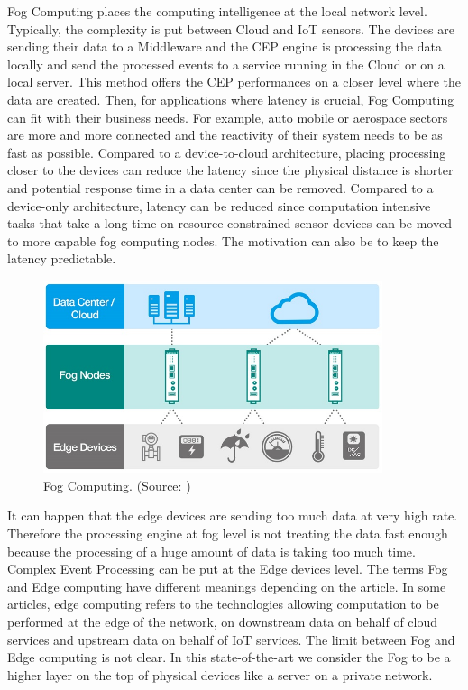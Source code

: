 \documentclass[11pt]{article}
\begin{document}
Fog Computing places the computing intelligence at the local network level. Typically, the complexity is put between Cloud and IoT sensors. The devices are sending their data to a Middleware and the CEP engine is processing the data locally and send the processed events to a service running in the Cloud or on a local server. This method offers the CEP performances on a closer level where the data are created. Then, for applications where latency is crucial, Fog Computing can fit with their business needs. For example, auto mobile or aerospace sectors are more and more connected and the reactivity of their system needs to be as fast as possible. Compared to a device-to-cloud architecture, placing processing closer to the devices can reduce the latency since the physical distance is shorter and potential response time in a data center can be removed. Compared to a device-only architecture, latency can be reduced since computation intensive tasks that take a long time on resource-constrained sensor devices can be moved to more capable fog computing nodes. The motivation can also be to keep the latency predictable.\cite{Towards-power-consumption-delay}

\begin{figure}[H]
	\includegraphics[width=\textwidth,height=160pt]{assets/Fog_Computing.jpg}
	\caption[Fog Computing]{
		Fog Computing. (Source: \cite{fog-computing})
	}
	\label{fig:Fog-Computing}
\end{figure}

It can happen that the edge devices are sending too much data at very high rate. Therefore the processing engine at fog level is not treating the data fast enough because the processing of a huge amount of data is taking too much time. Complex Event Processing can be put at the Edge devices level. The terms Fog and Edge computing have different meanings depending on the article. In some articles, edge computing refers to the technologies allowing computation to be performed at the edge of the network, on downstream data on behalf of cloud services and upstream data on behalf of IoT services.\cite{Edge-Computing-Vision-and-Challenges} The limit between Fog and Edge computing is not clear. In this state-of-the-art we consider the Fog to be a higher layer on the top of physical devices like a server on a private network. 
\end{document}

